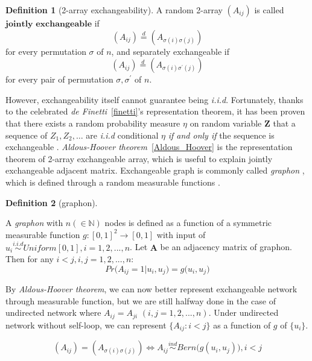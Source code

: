 \documentclass[12pt]{article}
\theoremstyle{definition}
\newtheorem{definition}{Definition}[section]
\begin{document}
	\begin{definition}[2-array exchangeability]
		\label{exchangeability}
		A random 2-array $(A_{ij})$ is called $\mathbf{\mbox{jointly exchangeable}}$ if 
		$$(A_{ij}) \stackrel{d}{=} (A_{\sigma(i) \sigma(j)})$$
		for every permutation $\sigma$ of $n$,
		and separately exchangeable if 
		$$(A_{ij}) \stackrel{d}{=} (A_{\sigma(i) \sigma^{\prime}(j) })$$
		for every pair of permutation $\sigma, \sigma^{\prime}$ of $n$.
	\end{definition}
	
However, exchangeability itself cannot guarantee being \textit{i.i.d}. Fortunately, thanks to the celebrated  \textit{de Finetti}~\ref{finetti}'s representation theorem, it has been proven that there exists a random probability measure $\eta$ on random variable $\mathbf{Z}$ that a sequence of $Z_{1}, Z_{2}, \ldots $ are \textit{i.i.d} conditional $\eta$ \textit{if and only if} the sequence is exchangeable \citep{orbanz2015bayesian, caron2014sparse}. \textit{Aldous-Hoover theorem}~\ref{Aldous_Hoover} is the representation theorem of 2-array exchangeable array, which is useful to explain jointly exchangeable adjacent matrix. Exchangeable graph is commonly called \textit{graphon} \citep{lovasz2006limits}, which is defined through a random measurable functions \citep{chan2013estimation}.
	
\begin{definition}[graphon]
	\label{graphon}
		
	A \textit{graphon} with $n (\in \mathbb{N})$ nodes is defined as a function of a symmetric measurable function $g : [0,1]^2 \rightarrow [0,1]$ with input of $u_{i} \overset{i.i.d}{\sim} Uniform[0,1], i = 1,2,... ,n$. 
	Let $\mathbf{A}$ be an adjacency matrix of graphon. Then for any $i < j, i,j=1,2,...,n$:	
\begin{equation}
	Pr \big(   A_{ij} = 1 \big| u_{i}, u_{j} \big) = g \big(  u_{i}, u_{j} \big)
\end{equation}
\end{definition}
By \textit{Aldous-Hoover theorem}, we can now better represent exchangeable network through measurable function, but we are still halfway done in the case of undirected network where $A_{ij} = A_{ji}$  $(i,j=1,2,... , n)$.  Under undirected network without self-loop, we can represent $\{ A_{ij} : i < j \}$ as a function of $g$ of $\{ u_{i}\}$. 
	
\begin{equation}
( A_{ij} )  =  (   A_{\sigma(i) \sigma(j)}  ) \Longleftrightarrow A_{ij} \overset{ind}{\sim} Bern\big(  g(u_{i}, u_{j}) \big), i < j
\end{equation}  
	
\end{document}

